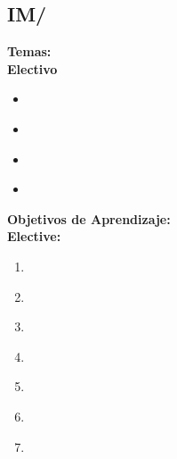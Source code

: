 \subsection{IM/\IMTransactionProcessing}\label{sec:BOK:IMTransactionProcessing}
\noindent \textbf{Temas:}\\
\noindent \textbf{Electivo}
\begin{itemize}
	\item \IMTransactionProcessingTopicTransactions\label{sec:BOK:IMTransactionProcessingTopicTransactions}
	\item \IMTransactionProcessingTopicFailure\label{sec:BOK:IMTransactionProcessingTopicFailure}
	\item \IMTransactionProcessingTopicConcurrency\label{sec:BOK:IMTransactionProcessingTopicConcurrency}
	\item \IMTransactionProcessingTopicInteraction\label{sec:BOK:IMTransactionProcessingTopicInteraction}
\end{itemize}


\noindent \textbf{Objetivos de Aprendizaje:}\\
\noindent \textbf{Elective:}
\begin{enumerate}
	\setcounter{enumi}{0}
	\item \IMTransactionProcessingLOCreateAEmbedding\xspace[\IMTransactionProcessingLOCreateAEmbeddingLevel]\label{sec:BOK:IMTransactionProcessingLOCreateAEmbedding}
	\item \IMTransactionProcessingLOExplainTheImplicit\xspace[\IMTransactionProcessingLOExplainTheImplicitLevel]\label{sec:BOK:IMTransactionProcessingLOExplainTheImplicit}
	\item \IMTransactionProcessingLODescribeTheTo\xspace[\IMTransactionProcessingLODescribeTheToLevel]\label{sec:BOK:IMTransactionProcessingLODescribeTheTo}
	\item \IMTransactionProcessingLOExplainWhen\xspace[\IMTransactionProcessingLOExplainWhenLevel]\label{sec:BOK:IMTransactionProcessingLOExplainWhen}
	\item \IMTransactionProcessingLOExplainTheDifferent\xspace[\IMTransactionProcessingLOExplainTheDifferentLevel]\label{sec:BOK:IMTransactionProcessingLOExplainTheDifferent}
	\item \IMTransactionProcessingLOChooseThe\xspace[\IMTransactionProcessingLOChooseTheLevel]\label{sec:BOK:IMTransactionProcessingLOChooseThe}
	\item \IMTransactionProcessingLOIdentifyAppropriateIn\xspace[\IMTransactionProcessingLOIdentifyAppropriateInLevel]\label{sec:BOK:IMTransactionProcessingLOIdentifyAppropriateIn}
\end{enumerate}


